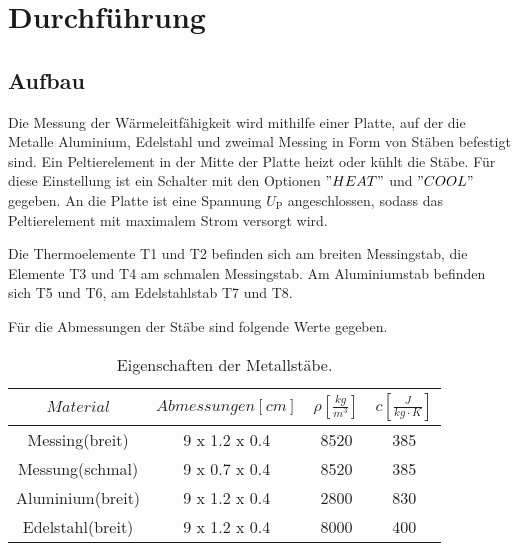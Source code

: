 \section{Durchführung} \label{sec:durchführung}

\subsection{Aufbau}

    Die Messung der Wärmeleitfähigkeit wird mithilfe einer Platte, auf der die Metalle
    Aluminium, Edelstahl und zweimal Messing in Form von Stäben befestigt sind.
    Ein Peltierelement in der Mitte der Platte heizt oder kühlt die Stäbe.
    Für diese Einstellung ist ein Schalter mit den Optionen $"HEAT"$ und $"COOL"$ gegeben.
    An die Platte ist eine Spannung $U_\text{P}$ angeschlossen, sodass das Peltierelement mit maximalem
    Strom versorgt wird.
    

    Die Thermoelemente T1 und T2 befinden sich am breiten Messingstab, die Elemente
    T3 und T4 am schmalen Messingstab.
    Am Aluminiumstab befinden sich T5 und T6, am Edelstahlstab T7 und T8.
   
    Für die Abmessungen der Stäbe sind folgende Werte gegeben.
    \begin{table}
        \centering
        \caption{Eigenschaften der Metallstäbe.}
        \label{tab:vorgegebeneDaten}
        \begin{tabular}{c c c c}
            \toprule
            $Material$ & $Abmessungen[cm]$ & $\rho [\frac{kg}{m^3}]$ & $c [\frac{J}{kg \cdot K}]$ \\
            \midrule
            Messing(breit) & 9 x 1.2 x 0.4 & 8520 & 385 \\
            Messung(schmal) & 9 x 0.7 x 0.4 & 8520 & 385 \\
            Aluminium(breit) & 9 x 1.2 x 0.4 & 2800 & 830 \\
            Edelstahl(breit) & 9 x 1.2 x 0.4 & 8000 & 400 \\
            \bottomrule
        \end{tabular}
    \end{table}

